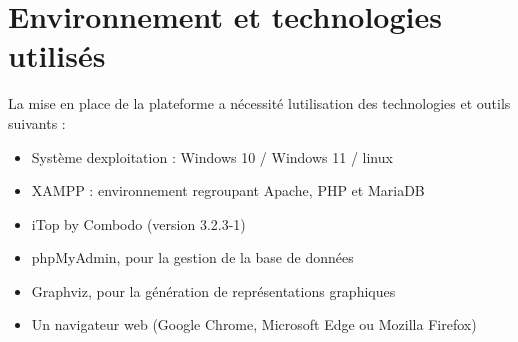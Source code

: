 \chapter{Environnement et technologies utilisés}


La mise en place de la plateforme a nécessité l\textquotesingle utilisation des technologies et outils suivants :

\begin{itemize}
\item
  Système d\textquotesingle exploitation : Windows 10 / Windows 11 / linux
\item
  XAMPP : environnement regroupant Apache, PHP et MariaDB
\item
  iTop by Combodo (version 3.2.3-1)
\item
  phpMyAdmin, pour la gestion de la base de données
\item
  Graphviz, pour la génération de représentations graphiques
\item
  Un navigateur web (Google Chrome, Microsoft Edge ou Mozilla Firefox)
\end{itemize}


